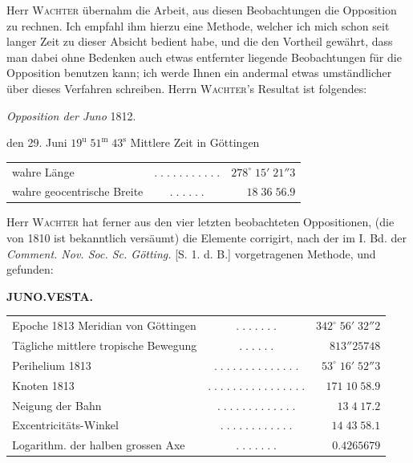 \par\indent Herr \textsc{Wachter} übernahm die Arbeit, aus diesen Beobachtungen die Opposition
zu rechnen. Ich empfahl ihm hierzu eine Methode, welcher ich mich schon
seit langer Zeit zu dieser Absicht bedient habe, und die den Vortheil
gewährt, dass man dabei ohne Bedenken auch etwas entfernter liegende
Beobachtungen für die Opposition benutzen kann; ich werde Ihnen ein
andermal etwas umständlicher über dieses Verfahren schreiben. Herrn
\textsc{Wachter}'s Resultat ist folgendes:

\begin{center}
\emph{Opposition der Juno} 1812.
\end{center}

den 29. Juni $19^{\mathrm u}\;51^{\mathrm m}\;43^{\mathrm s}$ Mittlere Zeit in Göttingen

\begin{center}\fontsize{10}{12}\selectfont\setlength{\tabcolsep}{2pt}\renewcommand{\arraystretch}{1.15}\begin{tabular}{lcr}
wahre Länge & $.\;.\;.\;.\;.\;.\;.\;.\;.\;.\;.$ & $278^\circ\;15'\;21''3$\\
wahre geocentrische Breite & $.\;.\;.\;.\;.\;.$ & $18\;36\;56.9$\\
\end{tabular}\end{center}

\par\indent Herr \textsc{Wachter} hat ferner aus den vier letzten beobachteten Oppositionen,
(die von 1810 ist bekanntlich versäumt) die Elemente corrigirt, nach der
im I. Bd. der \emph{Comment. Nov. Soc. Sc. Götting.} [S. 1. d. B.]
vorgetragenen Methode, und gefunden:
\clearpage
\thispagestyle{empty}
\noindent{}%
\makebox[12mm][l]{}%
\parbox[t]{\dimexpr\linewidth-24mm\relax}{\centering\footnotesize\bfseries JUNO.\quad VESTA.\par}%
\par\nobreak\medskip
\begin{center}\fontsize{9}{11}\selectfont\setlength{\tabcolsep}{2pt}\renewcommand{\arraystretch}{1.15}\begin{tabular}{lcr}
Epoche 1813 Meridian von Göttingen & $.\;.\;.\;.\;.\;.\;.$ & $342^\circ\;56'\;32''2$\\
Tägliche mittlere tropische Bewegung & $.\;.\;.\;.\;.\;.$ & $813''25748$\\
Perihelium 1813 & $.\;.\;.\;.\;.\;.\;.\;.\;.\;.\;.\;.\;.\;.$ & $53^\circ\;16'\;52''3$\\
Knoten 1813 & $.\;.\;.\;.\;.\;.\;.\;.\;.\;.\;.\;.\;.\;.\;.\;.$ & $171\;10\;58.9$\\
Neigung der Bahn & $.\;.\;.\;.\;.\;.\;.\;.\;.\;.\;.\;.\;.$ & $13\;4\;17.2$\\
Excentricitäts-Winkel & $.\;.\;.\;.\;.\;.\;.\;.\;.\;.\;.\;.$ & $14\;43\;58.1$\\
Logarithm. der halben grossen Axe & $.\;.\;.\;.\;.\;.\;.$ & $0.4265679$\\
\end{tabular}\end{center}

